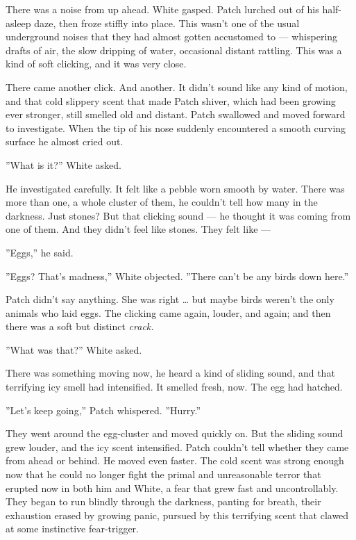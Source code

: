 \documentclass[12pt]{book}
\begin{document}
There was a noise from up ahead. White gasped. Patch lurched out of
his half-asleep daze, then froze stiffly into place. This wasn't one
of the usual underground noises that they had almost gotten accustomed
to --- whispering drafts of air, the slow dripping of water,
occasional distant rattling. This was a kind of soft clicking, and it
was very close.

There came another click. And another. It didn't sound like any kind
of motion, and that cold slippery scent that made Patch shiver, which
had been growing ever stronger, still smelled old and distant. Patch
swallowed and moved forward to investigate. When the tip of his nose
suddenly encountered a smooth curving surface he almost cried out.

''What is it?'' White asked.

He investigated carefully. It felt like a pebble worn smooth by
water. There was more than one, a whole cluster of them, he couldn't
tell how many in the darkness. Just stones? But that clicking sound
--- he thought it was coming from one of them. And they didn't feel
like stones. They felt like ---

''Eggs,'' he said.

''Eggs? That's madness,'' White objected. ''There can't be any birds
down here.''

Patch didn't say anything. She was right \ldots{} but maybe birds
weren't the only animals who laid eggs. The clicking came again,
louder, and again; and then there was a soft but distinct
\textit{crack.}

''What was that?'' White asked.

There was something moving now, he heard a kind of sliding sound, and
that terrifying icy smell had intensified. It smelled fresh, now. The
egg had hatched.

''Let's keep going,'' Patch whispered. ''Hurry.''

They went around the egg-cluster and moved quickly on. But the sliding
sound grew louder, and the icy scent intensified. Patch couldn't tell
whether they came from ahead or behind. He moved even faster. The cold
scent was strong enough now that he could no longer fight the primal
and unreasonable terror that erupted now in both him and White, a fear
that grew fast and uncontrollably. They began to run blindly through
the darkness, panting for breath, their exhaustion erased by growing
panic, pursued by this terrifying scent that clawed at some
instinctive fear-trigger.
\end{document}
